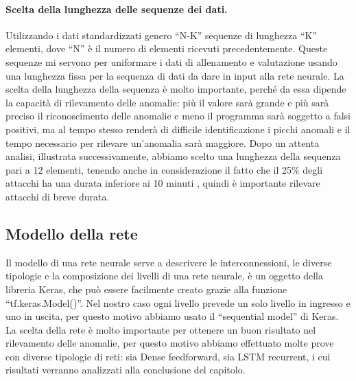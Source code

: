 
\paragraph{Scelta della lunghezza delle sequenze dei dati.} Utilizzando i dati standardizzati genero ``N-K'' sequenze di lunghezza ``K'' elementi, dove ``N'' è il numero di elementi ricevuti precedentemente. Queste sequenze mi servono per uniformare i dati di allenamento e valutazione usando una lunghezza fissa per la sequenza di dati da dare in input alla rete neurale.
La scelta della lunghezza della sequenza è molto importante, perché da essa dipende la capacità di rilevamento delle anomalie: più il valore sarà grande e più sarà preciso il riconoscimento delle anomalie e meno il programma sarà soggetto a falsi positivi, ma al tempo stesso renderà di difficile identificazione i picchi anomali e il tempo necessario per rilevare un'anomalia sarà maggiore.
Dopo un attenta analisi, illustrata successivamente, abbiamo scelto una lunghezza della sequenza pari a 12 elementi, tenendo anche in considerazione il fatto che il 25\% degli attacchi ha una durata inferiore ai 10 minuti \cite{imperva_ddos_report}, quindi è importante rilevare attacchi di breve durata.


\subsection{Modello della rete}


Il modello di una rete neurale serve a descrivere le interconnessioni, le diverse tipologie e la composizione dei livelli di una rete neurale, è un oggetto della libreria Keras, che può essere facilmente creato grazie alla funzione ``tf.keras.Model()''.
Nel nostro caso ogni livello prevede un solo livello in ingresso e uno in uscita, per questo motivo abbiamo usato il ``sequential model'' di Keras.
La scelta della rete è molto importante per ottenere un buon risultato nel rilevamento delle anomalie, per questo motivo abbiamo effettuato molte prove con diverse tipologie di reti: sia Dense feedforward, sia LSTM recurrent, i cui risultati verranno analizzati alla conclusione del capitolo.


